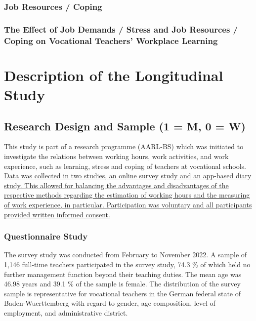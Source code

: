 \documentclass[
]{article}
\begin{document}
\subsubsection{Job Resources / Coping}\label{job-resources-coping}

\subsubsection{The Effect of Job Demands / Stress and Job Resources /
Coping on Vocational Teachers' Workplace
Learning}\label{the-effect-of-job-demands-stress-and-job-resources-coping-on-vocational-teachers-workplace-learning}

\section{Description of the Longitudinal
Study}\label{description-of-the-longitudinal-study}

\subsection{Research Design and Sample (1 = M, 0 =
W)}\label{research-design-and-sample-1-m-0-w}

This study is part of a research programme (AARL-BS) which was initiated
to investigate the relations between working hours, work activities, and
work experience, such as learning, stress and coping of teachers at
vocational schools. \ul{Data was collected in two studies, an online
survey study and an app-based diary study. This allowed for balancing
the advantages and disadvantages of the respective methods regarding the
estimation of working hours and the measuring of work experience, in
particular. Participation was voluntary and all participants provided
written informed consent.}

\subsubsection{Questionnaire Study}\label{questionnaire-study}

The survey study was conducted from February to November 2022. A sample
of 1,146 full-time teachers participated in the survey study, 74.3 \% of
which held no further management function beyond their teaching duties.
The mean age was 46.98 years and 39.1 \% of the sample is female. The
distribution of the survey sample is representative for vocational
teachers in the German federal state of Baden-Wuerttemberg with regard
to gender, age composition, level of employment, and administrative
district.
\end{document}
